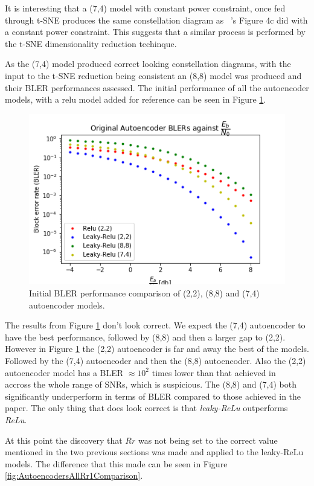 \documentclass[12pt,onecolumn,letterpaper]{article}
\newcommand{\code}{\textit}
\begin{document}
It is interesting that a (7,4) model with constant power constraint, once fed through t-SNE produces the same constellation diagram as ~\cite{oShea}'s Figure 4c did with a constant power constraint. This suggests that a similar process is performed by the t-SNE dimensionality reduction techinque. 

As the (7,4) model produced correct looking constellation diagrams, with the input to the t-SNE reduction being consistent an (8,8) model was produced and their BLER performances assessed. The initial performance of all the autoencoder models, with a relu model added for reference can be seen in Figure \ref{fig:AutoencodersAllOriginalComparison}.

\begin{figure}
   \centering
   \includegraphics[width=0.6\linewidth]{figures/autoencoders248_bler_EbNo_original_comparison.png}
   \caption{Initial BLER performance comparison of (2,2), (8,8) and (7,4) autoencoder models. }
   \label{fig:AutoencodersAllOriginalComparison}
\end{figure}

The results from Figure \ref{fig:AutoencodersAllOriginalComparison} don't look correct. We expect the (7,4) autoencoder to have the best performance, followed by (8,8) and then a larger gap to (2,2). However in Figure \ref{fig:AutoencodersAllOriginalComparison} the (2,2) autoencoder is far and away the best of the models. Followed by the (7,4) autoencoder and then the (8,8) autoencoder. Also the (2,2) autoencoder model has a BLER $\approx10^2$ times lower than that achieved in ~\cite{oShea} accross the whole range of SNRs, which is suspicious. The (8,8) and (7,4) both significantly underperform in terms of BLER compared to those achieved in the paper. The only thing that does look correct is that \code{leaky-ReLu} outperforms \code{ReLu}. 

At this point the discovery that $Rr$ was not being set to the correct value mentioned in the two previous sections was made and applied to the leaky-ReLu models. The difference that this made can be seen in Figure \ref{fig:AutoencodersAllRr1Comparison}.
\end{document}
